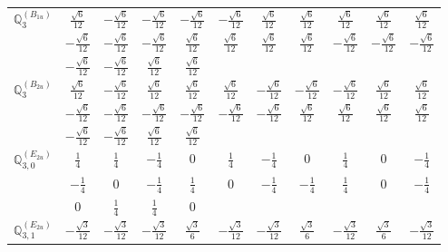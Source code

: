 \documentclass[fleqn,10pt,landscape]{article}
\begin{document}
\begin{itemize}
{\begin{center}
\begin{longtable}{ccccccccccc}
$\mathbb{Q}_{3}^{(B_{1u})}$ & $ \frac{\sqrt{6}}{12} $ & $ - \frac{\sqrt{6}}{12} $ & $ - \frac{\sqrt{6}}{12} $ & $ - \frac{\sqrt{6}}{12} $ & $ - \frac{\sqrt{6}}{12} $ & $ \frac{\sqrt{6}}{12} $ & $ \frac{\sqrt{6}}{12} $ & $ \frac{\sqrt{6}}{12} $ & $ \frac{\sqrt{6}}{12} $ & $ \frac{\sqrt{6}}{12} $ \\
& $ - \frac{\sqrt{6}}{12} $ & $ - \frac{\sqrt{6}}{12} $ & $ - \frac{\sqrt{6}}{12} $ & $ \frac{\sqrt{6}}{12} $ & $ \frac{\sqrt{6}}{12} $ & $ \frac{\sqrt{6}}{12} $ & $ \frac{\sqrt{6}}{12} $ & $ - \frac{\sqrt{6}}{12} $ & $ - \frac{\sqrt{6}}{12} $ & $ - \frac{\sqrt{6}}{12} $ \\
& $ - \frac{\sqrt{6}}{12} $ & $ - \frac{\sqrt{6}}{12} $ & $ \frac{\sqrt{6}}{12} $ & $ \frac{\sqrt{6}}{12} $ & $  $ & $  $ & $  $ & $  $ & $  $ & $  $ \\ \hline
$\mathbb{Q}_{3}^{(B_{2u})}$ & $ \frac{\sqrt{6}}{12} $ & $ - \frac{\sqrt{6}}{12} $ & $ \frac{\sqrt{6}}{12} $ & $ \frac{\sqrt{6}}{12} $ & $ \frac{\sqrt{6}}{12} $ & $ - \frac{\sqrt{6}}{12} $ & $ - \frac{\sqrt{6}}{12} $ & $ - \frac{\sqrt{6}}{12} $ & $ \frac{\sqrt{6}}{12} $ & $ \frac{\sqrt{6}}{12} $ \\
& $ - \frac{\sqrt{6}}{12} $ & $ - \frac{\sqrt{6}}{12} $ & $ - \frac{\sqrt{6}}{12} $ & $ - \frac{\sqrt{6}}{12} $ & $ - \frac{\sqrt{6}}{12} $ & $ - \frac{\sqrt{6}}{12} $ & $ \frac{\sqrt{6}}{12} $ & $ \frac{\sqrt{6}}{12} $ & $ \frac{\sqrt{6}}{12} $ & $ \frac{\sqrt{6}}{12} $ \\
& $ - \frac{\sqrt{6}}{12} $ & $ - \frac{\sqrt{6}}{12} $ & $ \frac{\sqrt{6}}{12} $ & $ \frac{\sqrt{6}}{12} $ & $  $ & $  $ & $  $ & $  $ & $  $ & $  $ \\ \hline
$\mathbb{Q}_{3,0}^{(E_{2u})}$ & $ \frac{1}{4} $ & $ \frac{1}{4} $ & $ - \frac{1}{4} $ & $ 0 $ & $ \frac{1}{4} $ & $ - \frac{1}{4} $ & $ 0 $ & $ \frac{1}{4} $ & $ 0 $ & $ - \frac{1}{4} $ \\
& $ - \frac{1}{4} $ & $ 0 $ & $ - \frac{1}{4} $ & $ \frac{1}{4} $ & $ 0 $ & $ - \frac{1}{4} $ & $ - \frac{1}{4} $ & $ \frac{1}{4} $ & $ 0 $ & $ - \frac{1}{4} $ \\
& $ 0 $ & $ \frac{1}{4} $ & $ \frac{1}{4} $ & $ 0 $ & $  $ & $  $ & $  $ & $  $ & $  $ & $  $ \\ \hline
$\mathbb{Q}_{3,1}^{(E_{2u})}$ & $ - \frac{\sqrt{3}}{12} $ & $ - \frac{\sqrt{3}}{12} $ & $ - \frac{\sqrt{3}}{12} $ & $ \frac{\sqrt{3}}{6} $ & $ - \frac{\sqrt{3}}{12} $ & $ - \frac{\sqrt{3}}{12} $ & $ \frac{\sqrt{3}}{6} $ & $ - \frac{\sqrt{3}}{12} $ & $ \frac{\sqrt{3}}{6} $ & $ - \frac{\sqrt{3}}{12} $ \\

\end{longtable}
\end{center}}
\end{itemize}
\end{document}
